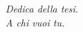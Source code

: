 \thispagestyle{empty}
\vspace*{\fill}

\begin{flushright}
  \itshape
  Dedica della tesi.\\
  A chi vuoi tu.
\end{flushright}

\vspace*{\fill}
\newpage
